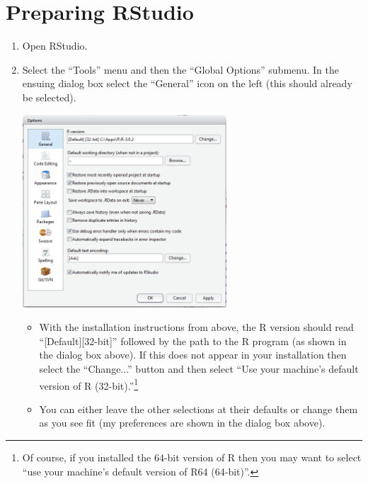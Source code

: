 \documentclass{article}\usepackage[]{graphicx}\usepackage[]{color}
\begin{document}
\section{Preparing RStudio}
\begin{enumerate}
  \item Open RStudio.

  \item Select the ``Tools'' menu and then the ``Global Options'' submenu.  In the ensuing dialog box select the ``General'' icon on the left (this should already be selected).
\begin{center}
  \includegraphics[width=3in]{Figs/RStudio_Prep_OptionsGeneral.png}
\end{center}
  \begin{itemize}
    \item With the installation instructions from above, the R version should read ``[Default][32-bit]'' followed by the path to the R program (as shown in the dialog box above).  If this does not appear in your installation then select the ``Change...'' button and then select ``Use your machine's default version of R (32-bit).''\footnote{Of course, if you installed the 64-bit version of R then you may want to select ``use your machine's default version of R64 (64-bit)''.}
    \item You can either leave the other selections at their defaults or change them as you see fit (my preferences are shown in the dialog box above).
  \end{itemize}


\end{enumerate}
\end{document}
